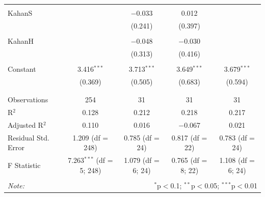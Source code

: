 \documentclass[
]{article}
\begin{document}
\begin{table}[!htbp]
\begin{tabular}{@{\extracolsep{5pt}}lcccc}
  & & & & \\ 
 KahanS &  & $-$0.033 & 0.012 &  \\ 
  &  & (0.241) & (0.397) &  \\ 
  & & & & \\ 
 KahanH &  & $-$0.048 & $-$0.030 &  \\ 
  &  & (0.313) & (0.416) &  \\ 
  & & & & \\ 
 Constant & 3.416$^{***}$ & 3.713$^{***}$ & 3.649$^{***}$ & 3.679$^{***}$ \\ 
  & (0.369) & (0.505) & (0.683) & (0.594) \\ 
  & & & & \\ 
\hline \\[-1.8ex] 
Observations & 254 & 31 & 31 & 31 \\ 
R$^{2}$ & 0.128 & 0.212 & 0.218 & 0.217 \\ 
Adjusted R$^{2}$ & 0.110 & 0.016 & $-$0.067 & 0.021 \\ 
Residual Std. Error & 1.209 (df = 248) & 0.785 (df = 24) & 0.817 (df = 22) & 0.783 (df = 24) \\ 
F Statistic & 7.263$^{***}$ (df = 5; 248) & 1.079 (df = 6; 24) & 0.765 (df = 8; 22) & 1.108 (df = 6; 24) \\ 
\hline 
\hline \\[-1.8ex] 
\textit{Note:}  & \multicolumn{4}{r}{$^{*}$p$<$0.1; $^{**}$p$<$0.05; $^{***}$p$<$0.01} \\ 
\end{tabular} 
\end{table} 
\endgroup
\end{document}
